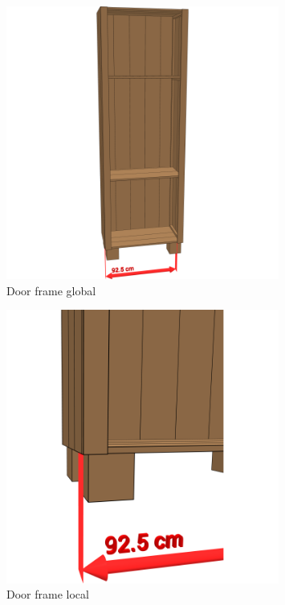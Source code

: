 \documentclass{article}
\begin{document}
\begin{figure}[h!]
    \centering
    \includegraphics[width=0.8\textwidth]{scene 10 - deurpost a.png}
    \caption{Door frame global}
    \label{fig:stap 10a}
\end{figure}

\begin{figure}[h!]
    \centering
    \includegraphics[width=0.8\textwidth]{scene 10 - deurpost b.png}
    \caption{Door frame local}
    \label{fig:stap 10b}
\end{figure}

\clearpage
\newpage
\end{document}
